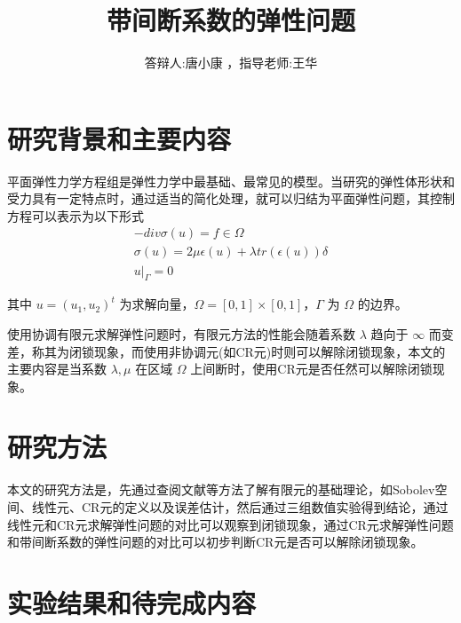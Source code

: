 \documentclass[UTF8]{ctexbeamer} %
\title{带间断系数的弹性问题} %
\author[唐小康]{答辩人:唐小康 ，指导老师:王华}
\begin{document}
\begin{frame}
	\titlepage
\end{frame}

\begin{frame}
	\tableofcontents
\end{frame}

\section{研究背景和主要内容}
\begin{frame}
	平面弹性力学方程组是弹性力学中最基础、最常见的模型。当研究的弹性体形状和受力具有一定特点时，通过适当的简化处理，就可以归结为平面弹性问题，其控制方程可以表示为以下形式
	$$
	\begin{matrix}
		-div \sigma (u) = f \in \Omega \\
		\sigma(u) = 2 \mu \epsilon(u) + \lambda tr(\epsilon(u)) \delta \\
		u |_{\Gamma} = 0
	\end{matrix}
	$$
	
	其中 $u=(u_1,u_2)^t$ 为求解向量，$\Omega = [0,1] \times [0,1]$，$\Gamma$ 为 $\Omega$ 的边界。 
\end{frame}

\begin{frame}
	使用协调有限元求解弹性问题时，有限元方法的性能会随着系数 $\lambda$ 趋向于 $\infty$ 而变差，称其为闭锁现象，而使用非协调元(如CR元)时则可以解除闭锁现象，本文的主要内容是当系数 $\lambda, \mu$ 在区域 $\Omega$ 上间断时，使用CR元是否任然可以解除闭锁现象。
\end{frame}

\section{研究方法}
\begin{frame}
	本文的研究方法是，先通过查阅文献等方法了解有限元的基础理论，如Sobolev空间、线性元、CR元的定义以及误差估计，然后通过三组数值实验得到结论，通过线性元和CR元求解弹性问题的对比可以观察到闭锁现象，通过CR元求解弹性问题和带间断系数的弹性问题的对比可以初步判断CR元是否可以解除闭锁现象。
\end{frame}

\section{实验结果和待完成内容}
\end{document}
